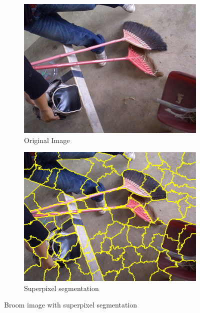 \begin{figure}
    \captionsetup{justification=centering}

    \begin{subfigure}[t]{0.48\textwidth}
        \captionsetup{justification=centering}
        \centering
        \includegraphics[width=.7\linewidth]{figuras/lime/experiments/broom.jpeg}
        \caption{Original Image}
    \end{subfigure}
    \hfill
    \begin{subfigure}[t]{0.48\textwidth}
        \captionsetup{justification=centering}
        \centering
        \includegraphics[width=.7\linewidth]{figuras/lime/experiments/broom_lime_segmentation.png}
        \caption{Superpixel segmentation}
    \end{subfigure}

    \caption{Broom image with superpixel segmentation}
\end{figure}

